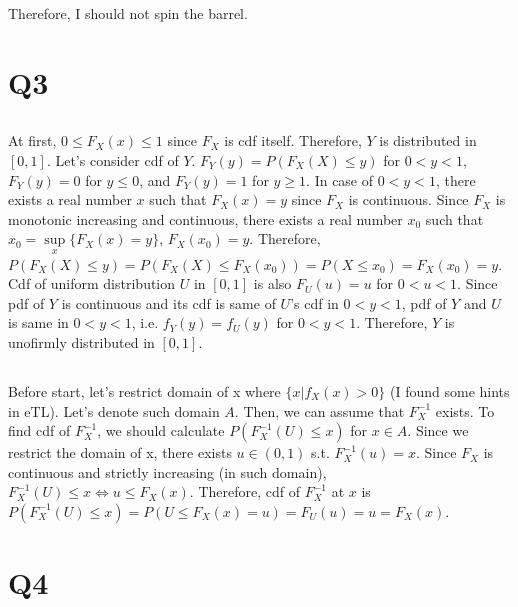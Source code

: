 \documentclass{article}
\begin{document}
Therefore, I should not spin the barrel.

\section{Q3}

\subsection{}
At first, $0 \leq F_X(x) \leq 1$ since $F_X$ is cdf itself.
Therefore, $Y$ is distributed in $[0,1]$.
Let's consider cdf of $Y$.
$F_Y(y) = P(F_X(X) \leq y)$ for $0 < y < 1$, $F_Y(y) = 0$ for $y \leq 0$,
    and $F_Y(y) = 1$ for $y \geq 1$.
In case of $0 < y < 1$, there exists a real number $x$ such that $F_X(x)=y$
    since $F_X$ is continuous.
Since $F_X$ is monotonic increasing and continuous,
    there exists a real number $x_0$
    such that $x_0 = \sup\limits_{x}\{F_X(x)=y\}$, $F_X(x_0)=y$.
Therefore,
$P(F_X(X) \leq y)
= P(F_X(X) \leq F_X(x_0))
= P(X \leq x_0)
= F_X(x_0)
= y$.
Cdf of uniform distribution $U$ in $[0,1]$ is also $F_U(u)=u$ for $0 < u < 1$.
Since pdf of $Y$ is continuous and its cdf is same of $U$'s cdf in $0 < y < 1$,
    pdf of $Y$ and $U$ is same in $0 < y < 1$, i.e. $f_Y(y)=f_U(y)$ for $0 < y < 1$.
Therefore, $Y$ is unofirmly distributed in $[0,1]$.

\subsection{}
Before start, let's restrict domain of x where $\{x|f_X(x) > 0\}$ (I found some hints in eTL).
Let's denote such domain $A$.
Then, we can assume that $F_X^{-1}$ exists.
To find cdf of $F_X^{-1}$, we should calculate $P(F_X^{-1}(U) \leq x)$ for $x \in A$.
Since we restrict the domain of x, there exists $u \in (0,1)$ s.t. $F_X^{-1}(u)=x$.
Since $F_X$ is continuous and strictly increasing (in such domain),
    $F_X^{-1}(U) \leq x \iff u \leq F_X(x)$.
Therefore, cdf of $F_X^{-1}$ at $x$ is
$P(F_X^{-1}(U) \leq x)
= P(U \leq F_X(x) = u)
= F_U(u)
= u
= F_X(x)$.

\section{Q4}
\end{document}
